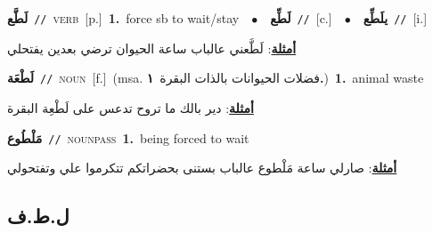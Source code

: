 \documentclass[10pt,a4paper,twoside]{article} %
\begin{document}
\begin{multicols}{2}
{\setlength\topsep{0pt}\textbf{\foreignlanguage{arabic}{لَطَّع}}\ {\color{gray}\texttt{//}\color{black}}\ \textsc{verb}\ [p.]\ \textbf{1.}~force sb to wait/stay\ \ $\bullet$\ \ \setlength\topsep{0pt}\textbf{\foreignlanguage{arabic}{لَطِّع}}\ {\color{gray}\texttt{//}\color{black}}\ [c.]\ \ $\bullet$\ \ \setlength\topsep{0pt}\textbf{\foreignlanguage{arabic}{يلَطِّع}}\ {\color{gray}\texttt{//}\color{black}}\ [i.]\  \begin{flushright}\color{gray}\foreignlanguage{arabic}{\textbf{\underline{\foreignlanguage{arabic}{أمثلة}}}: لَطَّعني عالباب ساعة الحيوان ترضي بعدين يفتحلي}\end{flushright}\color{black}} \vspace{2mm}

{\setlength\topsep{0pt}\textbf{\foreignlanguage{arabic}{لَطْعَة}}\ {\color{gray}\texttt{//}\color{black}}\ \textsc{noun}\ [f.]\ \color{gray}(msa. \foreignlanguage{arabic}{فضلات الحيوانات بالذات البقرة}~\foreignlanguage{arabic}{\textbf{١.}})\color{black}\ \textbf{1.}~animal waste\  \begin{flushright}\color{gray}\foreignlanguage{arabic}{\textbf{\underline{\foreignlanguage{arabic}{أمثلة}}}: دير بالك ما تروح تدعس على لَطْعِة البقرة}\end{flushright}\color{black}} \vspace{2mm}

{\setlength\topsep{0pt}\textbf{\foreignlanguage{arabic}{مَلْطُوع}}\ {\color{gray}\texttt{//}\color{black}}\ \textsc{noun\textunderscore pass}\ \textbf{1.}~being forced to wait\  \begin{flushright}\color{gray}\foreignlanguage{arabic}{\textbf{\underline{\foreignlanguage{arabic}{أمثلة}}}: صارلي ساعة مَلْطوع عالباب بستنى بحضراتكم تتكرموا علي وتفتحولي}\end{flushright}\color{black}} \vspace{2mm}

\vspace{-3mm}
\subsection*{\color{blue}\foreignlanguage{arabic}{ل.ط.ف}\color{blue}{}} 


\end{multicols}
\end{document}
